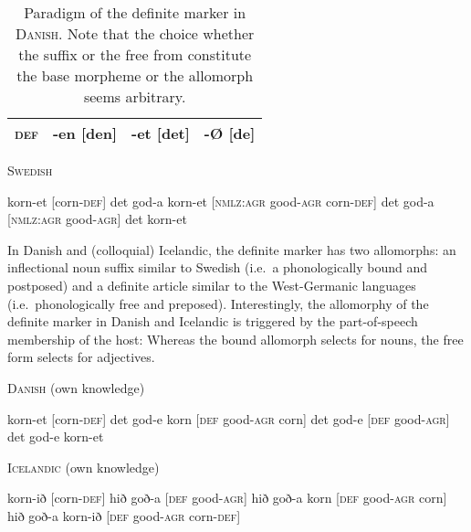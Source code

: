 {\begin{table}[h]
\begin{center}
\begin{footnotesize}
\begin{tabular}{l | ccc}
\hline
\textsc{def}&-en [den]			&-et [det]			&-{Ø} [de]\\
\hline
\hline
\end{tabular}
\caption[Paradigm of \textsc{def} in \textsc{Danish}]{Paradigm of the definite marker in \textsc{Danish}. Note that the choice whether the suffix or the free from constitute the base morpheme or the allomorph seems arbitrary.}\label{danish defallomorph}
\end{footnotesize}
\end{center}
\end{table}
\newpage
\begin{exe}
\ex \textsc{Swedish}
\begin{xlist}
\ex korn-et [corn-\textsc{def}]
\ex det god-a korn-et [\textsc{nmlz:agr} good-\textsc{agr} corn-\textsc{def}]
\ex det god-a [\textsc{nmlz:agr} good-\textsc{agr}]
\ex *det korn-et
\end{xlist}
\end{exe}
In Danish and (colloquial) Icelandic, the definite marker has two allomorphs: an inflectional noun suffix similar to Swedish (i.e.~a phonologically bound and postposed) and a definite article similar to the West-Germanic languages (i.e.~phonologically free and preposed). Interestingly, the allomorphy of the definite marker in Danish and Icelandic is triggered by the part-of-speech membership of the host: Whereas the bound allomorph selects for nouns, the free form selects for adjectives.
\begin{exe}
\ex \textsc{Danish} (own knowledge)
\begin{xlist}
\ex 	korn-et [corn-\textsc{def}]
\ex	det god-e korn [\textsc{def} good-\textsc{agr} corn]
\ex	det god-e [\textsc{def} good-\textsc{agr}]
\ex	*det god-e korn-et
\end{xlist}
\end{exe}
\begin{exe}
\ex \textsc{Icelandic} (own knowledge)
\begin{xlist}
\ex 	korn-ið [corn-\textsc{def}]
\ex	hið goð-a [\textsc{def} good-\textsc{agr}]
\ex	hið goð-a korn [\textsc{def} good-\textsc{agr} corn]
\ex	*hið goð-a korn-ið [\textsc{def} good-\textsc{agr} corn-\textsc{def}]
\end{xlist}
\end{exe}
}
